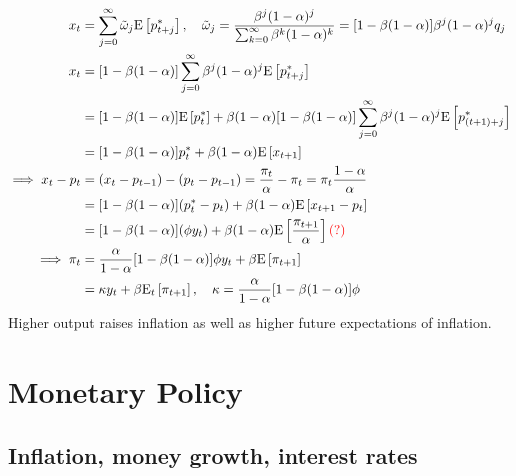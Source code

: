 \documentclass{article}
\newcommand{\E}[1]{\mathrm{E}\left[#1\right]}
\newcommand{\Et}[1]{\mathrm{E}_t\left[#1\right]}
\newcommand{\?}{\textcolor{red}{(?)}} %
\begin{document}
        \begin{align}
            x_t
            &= \sum_{j=0}^\infty \tilde\omega_{j} \E{p_{t+j}^*}
            ,\quad
            \tilde\omega_j
            = \frac{\beta^j (1-\alpha)^j}{\sum_{k=0}^\infty \beta^k (1-\alpha)^k}
            = [1 - \beta(1-\alpha)] \beta^j (1-\alpha)^j q_j
            \\
            x_t
            &= [1 - \beta(1-\alpha)] \sum_{j=0}^\infty \beta^j (1-\alpha)^j \E{p_{t+j}^*}
            \\
            &= [1 - \beta(1-\alpha)] \E{p_{t}^*}
            + \beta (1-\alpha) [1 - \beta(1-\alpha)] \sum_{j=0}^\infty \beta^j (1-\alpha)^j \E{p_{(t+1)+j}^*}
            \\
            &= [1 - \beta(1-\alpha)] p_{t}^*
            + \beta (1-\alpha) \E{x_{t+1}}
            \\
            \implies
            x_t - p_t
            &= (x_t - p_{t-1}) - (p_t - p_{t-1})
            = \frac{\pi_t}{\alpha} - \pi_t
            = \pi_t \frac{1 - \alpha}{\alpha}
            \\
            &= [1 - \beta(1-\alpha)] (p_{t}^* - p_t)
            + \beta (1-\alpha) \E{x_{t+1} - p_t}
            \\
            &= [1 - \beta(1-\alpha)] (\phi y_t) 
            + \beta (1-\alpha) \E{\frac{\pi_{t+1}}{\alpha}}
            \? %
            \\
            \implies
            \pi_t
            &=
            \frac{\alpha}{1-\alpha}
            [1 - \beta(1-\alpha)] \phi y_t
            + \beta \E{\pi_{t+1}}
            \\
            &= \kappa y_t + \beta \Et{\pi_{t+1}},
            \quad
            \kappa = \frac{\alpha}{1-\alpha}
            [1 - \beta(1-\alpha)] \phi
            \label{eqn:nk-phillips-curve}
        \end{align}
        Higher output raises inflation as well as higher future expectations of inflation.
        
    \section{Monetary Policy}
    
    \subsection{Inflation, money growth, interest rates}
        
\end{document}
